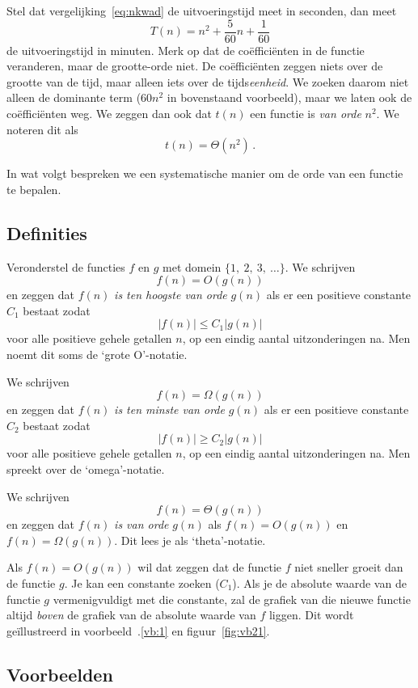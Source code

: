 Stel dat vergelijking~\eqref{eq:nkwad} de uitvoeringstijd meet in seconden, dan meet 
\begin{equation*}
T(n)=n^2+\frac5{60}n+\frac1{60}
\end{equation*}
de uitvoeringstijd in minuten. Merk op dat de coëfficiënten in de functie veranderen, maar de grootte-orde niet. De coëfficiënten zeggen niets over de grootte van de tijd, maar alleen iets over de tijds\emph{eenheid}. We zoeken daarom niet alleen de dominante term ($60n^2$ in bovenstaand voorbeeld), maar we laten ook de coëfficiënten weg. We zeggen dan ook dat $t(n)$ een functie is \emph{van orde} $n^2$. We noteren dit als
\begin{equation*}
t(n)=\Theta(n^2)\,.
\end{equation*}

In wat volgt bespreken we een systematische manier om de orde van een functie te bepalen.

\subsection{Definities}
Veronderstel de functies $f$ en $g$ met domein $\{1,~2,~3,~\dots\}$.
We schrijven
\[
f(n)=O(g(n))
\]
en zeggen dat $f(n)$ \emph{is ten hoogste van orde} $g(n)$ als er een positieve constante $C_1$ bestaat zodat
\[
|f(n)|\leq C_1|g(n)|
\]
voor alle  positieve gehele getallen $n$, op een eindig aantal uitzonderingen na. Men noemt dit soms de `grote O'-notatie.

We schrijven
\[
f(n)=\Omega(g(n))
\]
en zeggen dat $f(n)$ \emph{is ten minste van orde} $g(n)$ als er een positieve constante $C_2$ bestaat zodat
\[
|f(n)|\geq C_2|g(n)|
\]
voor alle  positieve gehele getallen $n$, op een eindig aantal uitzonderingen na.  Men spreekt over de `omega'-notatie.

We schrijven
\[
f(n)=\Theta(g(n))
\]
en zeggen dat $f(n)$ \emph{is van orde} $g(n)$ als $f(n)=O(g(n))$ en $f(n)=\Omega(g(n))$. Dit lees je als `theta'-notatie.

Als $f(n)=O(g(n))$ wil dat zeggen dat de functie $f$ niet sneller groeit dan de functie $g$. Je kan een constante zoeken ($C_1$). Als je de absolute waarde van de  functie $g$ vermenigvuldigt met die constante, zal de grafiek van die nieuwe functie altijd \emph{boven} de grafiek van de absolute waarde van $f$ liggen. Dit wordt geïllustreerd in voorbeeld~\thesection.\ref{vb:1} en figuur~\ref{fig:vb21}.

\subsection{Voorbeelden}

